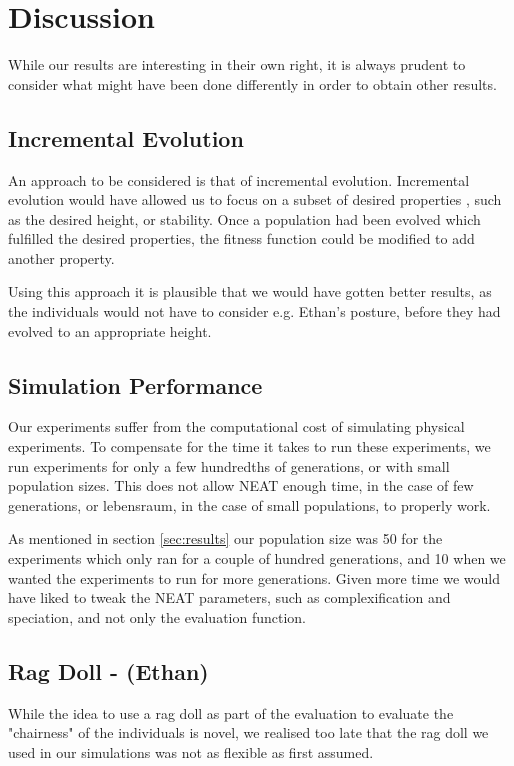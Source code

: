 \section{Discussion}
While our results are interesting in their own right, it is always prudent to 
consider what might have been done differently in order to obtain other results.

\subsection{Incremental Evolution}
An approach to be considered is that of incremental evolution. Incremental
evolution would have allowed us to focus on a subset of desired properties ,
such as the desired height, or stability. Once a population had been evolved
which fulfilled the desired properties, the fitness function could be modified
to add another property. 

Using this approach it is plausible that we would have gotten better results,
as the individuals would not have to consider e.g. Ethan's posture, before they
had evolved to an appropriate height.

\subsection{Simulation Performance}
Our experiments suffer from the computational cost of simulating physical
experiments. To compensate for the time it takes to run these experiments, we
run experiments for only a few hundredths of generations, or with small
population sizes. This does not allow NEAT enough time, in the case of few 
generations, or lebensraum, in the case of small populations, to properly work.

As mentioned in section \ref{sec:results} our population size was 50 for the 
experiments which only ran for a couple of hundred generations, and 10 when we 
wanted the experiments to run for more generations.
Given more time we would have liked to tweak the NEAT parameters, such as
complexification and speciation, and not only the evaluation function.

\subsection{Rag Doll - (Ethan)}
While the idea to use a rag doll as part of the evaluation to evaluate the 
"chairness" of the individuals is novel, we realised too late that the rag doll 
we used in our simulations was not as flexible as first assumed.

